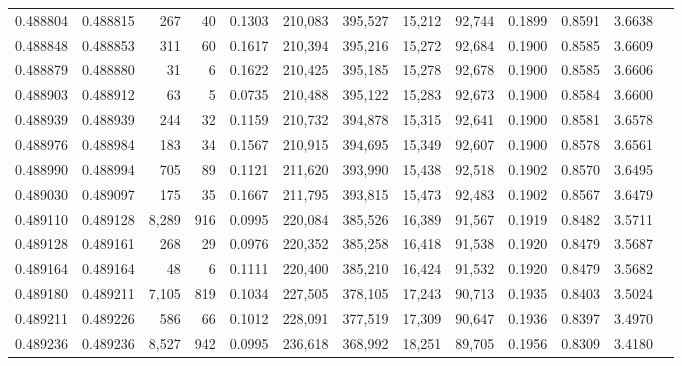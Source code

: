 \begin{tabular}{rrrrrrrrrrrrr}
0.488804 & 0.488815 &   267 &    40 &                                     0.1303 & 210,083 & 395,527 &  15,212 &  92,744 & 0.1899 & 0.8591 & 3.6638 \\
0.488848 & 0.488853 &   311 &    60 &                                     0.1617 & 210,394 & 395,216 &  15,272 &  92,684 & 0.1900 & 0.8585 & 3.6609 \\
0.488879 & 0.488880 &    31 &     6 &                                     0.1622 & 210,425 & 395,185 &  15,278 &  92,678 & 0.1900 & 0.8585 & 3.6606 \\
0.488903 & 0.488912 &    63 &     5 &                                     0.0735 & 210,488 & 395,122 &  15,283 &  92,673 & 0.1900 & 0.8584 & 3.6600 \\
0.488939 & 0.488939 &   244 &    32 &                                     0.1159 & 210,732 & 394,878 &  15,315 &  92,641 & 0.1900 & 0.8581 & 3.6578 \\
0.488976 & 0.488984 &   183 &    34 &                                     0.1567 & 210,915 & 394,695 &  15,349 &  92,607 & 0.1900 & 0.8578 & 3.6561 \\
0.488990 & 0.488994 &   705 &    89 &                                     0.1121 & 211,620 & 393,990 &  15,438 &  92,518 & 0.1902 & 0.8570 & 3.6495 \\
0.489030 & 0.489097 &   175 &    35 &                                     0.1667 & 211,795 & 393,815 &  15,473 &  92,483 & 0.1902 & 0.8567 & 3.6479 \\
0.489110 & 0.489128 & 8,289 &   916 &                                     0.0995 & 220,084 & 385,526 &  16,389 &  91,567 & 0.1919 & 0.8482 & 3.5711 \\
0.489128 & 0.489161 &   268 &    29 &                                     0.0976 & 220,352 & 385,258 &  16,418 &  91,538 & 0.1920 & 0.8479 & 3.5687 \\
0.489164 & 0.489164 &    48 &     6 &                                     0.1111 & 220,400 & 385,210 &  16,424 &  91,532 & 0.1920 & 0.8479 & 3.5682 \\
0.489180 & 0.489211 & 7,105 &   819 &                                     0.1034 & 227,505 & 378,105 &  17,243 &  90,713 & 0.1935 & 0.8403 & 3.5024 \\
0.489211 & 0.489226 &   586 &    66 &                                     0.1012 & 228,091 & 377,519 &  17,309 &  90,647 & 0.1936 & 0.8397 & 3.4970 \\
0.489236 & 0.489236 & 8,527 &   942 &                                     0.0995 & 236,618 & 368,992 &  18,251 &  89,705 & 0.1956 & 0.8309 & 3.4180 \\

\end{tabular}

